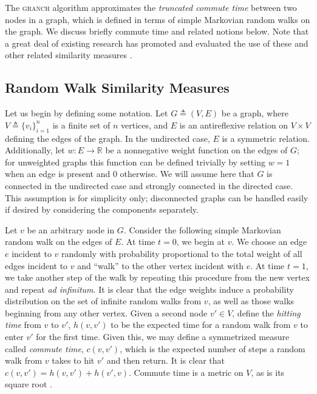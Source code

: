 \documentclass{acm_proc_article-sp}
\newcommand{\deq}{\triangleq}
\newcommand{\R}{\mathbb{R}}
\begin{document}
The \textsc{granch} algorithm approximates the \emph{truncated commute
  time} between two nodes in a graph, which is defined in terms of
simple Markovian random walks on the graph.  We discuss briefly
commute time and related notions below.  Note that a great deal of
existing research has promoted and evaluated the use of these and
other related similarity measures \citep{fousssigmoid}.

\subsection{Random Walk Similarity Measures}

Let us begin by defining some notation.  Let $G \deq (V, E)$ be a
graph, where $V \deq \lbrace v_i \rbrace_{i=1}^n$ is a finite set of
$n$ vertices, and $E$ is an antireflexive relation on $V \times V$
defining the edges of the graph.  In the undirected case, $E$ is a
symmetric relation.  Additionally, let $w\colon E \to \R$ be a
nonnegative weight function on the edges of $G$; for unweighted graphs
this function can be defined trivially by setting $w = 1$ when an edge
is present and $0$ otherwise.  We will assume here that $G$ is
connected in the undirected case and strongly connected in the
directed case.  This assumption is for simplicity only; disconnected
graphs can be handled easily if desired by considering the components
separately.

Let $v$ be an arbitrary node in $G$.  Consider the following simple
Markovian random walk on the edges of $E$.  At time $t = 0$, we begin
at $v$.  We choose an edge $e$ incident to $v$ randomly with
probability proportional to the total weight of all edges incident to
$v$ and ``walk'' to the other vertex incident with $e$.  At time $t =
1$, we take another step of the walk by repeating this procedure from
the new vertex and repeat \emph{ad infinitum}.  It is clear that the
edge weights induce a probability distribution on the set of infinite
random walks from $v$, as well as those walks beginning from any other
vertex.  Given a second node $v' \in V$, define the \emph{hitting
  time} from $v$ to $v'$, $h(v, v')$ to be the expected time for a
random walk from $v$ to enter $v'$ for the first time.  Given this, we
may define a symmetrized measure called \emph{commute time}, $c(v,
v')$, which is the expected number of steps a random walk from $v$
takes to hit $v'$ and then return.  It is clear that $c(v, v') = h(v,
v') + h(v', v)$.  Commute time is a metric on $V$, as is its square
root \citep{fouss}.
\end{document}
